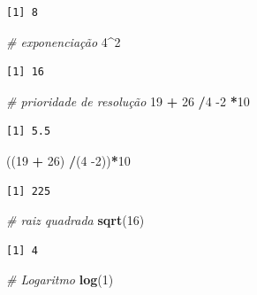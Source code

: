 \documentclass[12pt,brazil,]{book}
\newenvironment{Shaded}{\begin{snugshade}}{\end{snugshade}}
\newcommand{\CommentTok}[1]{\textcolor[rgb]{0.56,0.35,0.01}{\textit{#1}}}
\newcommand{\DecValTok}[1]{\textcolor[rgb]{0.00,0.00,0.81}{#1}}
\newcommand{\KeywordTok}[1]{\textcolor[rgb]{0.13,0.29,0.53}{\textbf{#1}}}
\newcommand{\NormalTok}[1]{#1}
\newcommand{\OperatorTok}[1]{\textcolor[rgb]{0.81,0.36,0.00}{\textbf{#1}}}
\newcommand{\StringTok}[1]{\textcolor[rgb]{0.31,0.60,0.02}{#1}}
\begin{document}
\begin{verbatim}
[1] 8
\end{verbatim}

\begin{Shaded}
\begin{Highlighting}[]
\CommentTok{# exponenciação}
\DecValTok{4}\OperatorTok{^}\DecValTok{2}
\end{Highlighting}
\end{Shaded}

\begin{verbatim}
[1] 16
\end{verbatim}

\begin{Shaded}
\begin{Highlighting}[]
\CommentTok{# prioridade de resolução}
\DecValTok{19} \OperatorTok{+}\StringTok{ }\DecValTok{26} \OperatorTok{/}\DecValTok{4} \DecValTok{-2} \OperatorTok{*}\DecValTok{10}
\end{Highlighting}
\end{Shaded}

\begin{verbatim}
[1] 5.5
\end{verbatim}

\begin{Shaded}
\begin{Highlighting}[]
\NormalTok{((}\DecValTok{19} \OperatorTok{+}\StringTok{ }\DecValTok{26}\NormalTok{) }\OperatorTok{/}\NormalTok{(}\DecValTok{4} \DecValTok{-2}\NormalTok{))}\OperatorTok{*}\DecValTok{10}
\end{Highlighting}
\end{Shaded}

\begin{verbatim}
[1] 225
\end{verbatim}

\begin{Shaded}
\begin{Highlighting}[]
\CommentTok{# raiz quadrada}
\KeywordTok{sqrt}\NormalTok{(}\DecValTok{16}\NormalTok{)}
\end{Highlighting}
\end{Shaded}

\begin{verbatim}
[1] 4
\end{verbatim}

\begin{Shaded}
\begin{Highlighting}[]
\CommentTok{# Logaritmo }
\KeywordTok{log}\NormalTok{(}\DecValTok{1}\NormalTok{)}
\end{Highlighting}
\end{Shaded}
\end{document}
